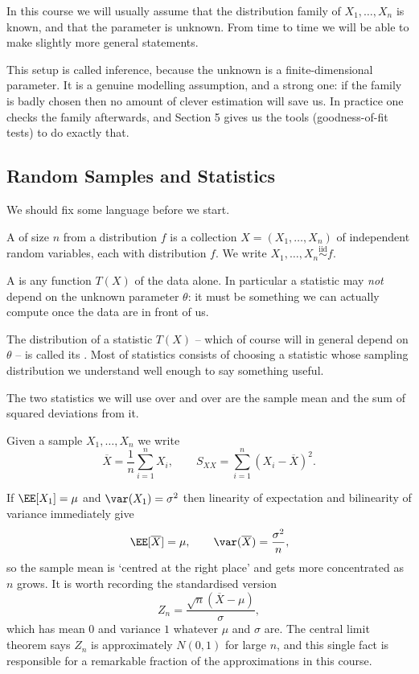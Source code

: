 In this course we will usually assume that the distribution family of $X_1, \dots, X_n$ is known, and that the parameter is unknown. From time to time we will be able to make slightly more general statements.

This setup is called  inference, because the unknown is a finite-dimensional parameter. It is a genuine modelling assumption, and a strong one: if the family is badly chosen then no amount of clever estimation will save us. In practice one checks the family afterwards, and Section 5 gives us the tools (goodness-of-fit tests) to do exactly that.

\subsection{Random Samples and Statistics}

We should fix some language before we start.

\begin{definition}
  A  of size $n$ from a distribution $f$ is a collection $X = (X_1, \dots, X_n)$ of independent random variables, each with distribution $f$. We write $X_1, \dots, X_n \stackrel{\text{iid}}{\sim} f$.
\end{definition}

\begin{definition}[Statistic]
  A  is any function $T(X)$ of the data alone. In particular a statistic may \emph{not} depend on the unknown parameter $\theta$: it must be something we can actually compute once the data are in front of us.
\end{definition}

The distribution of a statistic $T(X)$ -- which of course will in general depend on $\theta$ -- is called its . Most of statistics consists of choosing a statistic whose sampling distribution we understand well enough to say something useful.

The two statistics we will use over and over are the sample mean and the sum of squared deviations from it.

\begin{definition}
  Given a sample $X_1, \dots, X_n$ we write
  $$
  \overline{X} = \frac{1}{n} \sum_{i = 1}^{n} X_i, \qquad S_{XX} = \sum_{i = 1}^{n} \left(X_i - \overline{X}\right)^2.
  $$
\end{definition}

If $\EE[X_1] = \mu$ and $\var(X_1) = \sigma^2$ then linearity of expectation and bilinearity of variance immediately give
$$
\EE[\overline{X}] = \mu, \qquad \var(\overline{X}) = \frac{\sigma^2}{n},
$$
so the sample mean is `centred at the right place' and gets more concentrated as $n$ grows. It is worth recording the standardised version
$$
Z_n = \frac{\sqrt{n}\left(\overline{X} - \mu\right)}{\sigma},
$$
which has mean $0$ and variance $1$ whatever $\mu$ and $\sigma$ are. The central limit theorem says $Z_n$ is approximately $N(0,1)$ for large $n$, and this single fact is responsible for a remarkable fraction of the approximations in this course.

